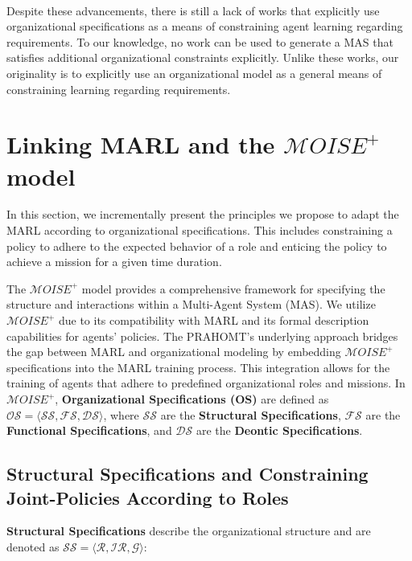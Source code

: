 \documentclass[sigconf,anonymous]{aamas}
\begin{document}
\

Despite these advancements, there is still a lack of works that explicitly use organizational specifications as a means of constraining agent learning regarding requirements. To our knowledge, no work can be used to generate a MAS that satisfies additional organizational constraints explicitly. Unlike these works, our originality is to explicitly use an organizational model as a general means of constraining learning regarding requirements.


\section{Linking MARL and the $\mathcal{M}OISE^+$ model}\label{sec:linking_marl_moise}
\label{sec:marl_moise_linking}

In this section, we incrementally present the principles we propose to adapt the MARL according to organizational specifications. This includes constraining a policy to adhere to the expected behavior of a role and enticing the policy to achieve a mission for a given time duration.


The $\mathcal{M}OISE^+$ model provides a comprehensive framework for specifying the structure and interactions within a Multi-Agent System (MAS). We utilize $\mathcal{M}OISE^+$ due to its compatibility with MARL and its formal description capabilities for agents' policies. The PRAHOMT's underlying approach bridges the gap between MARL and organizational modeling by embedding $\mathcal{M}OISE^+$ specifications into the MARL training process. This integration allows for the training of agents that adhere to predefined organizational roles and missions.
%
In $\mathcal{M}OISE^+$, \textbf{Organizational Specifications (OS)} are defined as $\mathcal{OS} = \langle \mathcal{SS}, \mathcal{FS}, \mathcal{DS} \rangle$, where $\mathcal{SS}$ are the \textbf{Structural Specifications}, $\mathcal{FS}$ are the \textbf{Functional Specifications}, and $\mathcal{DS}$ are the \textbf{Deontic Specifications}.

\subsection{Structural Specifications and Constraining Joint-Policies According to Roles}

\textbf{Structural Specifications} describe the organizational structure and are denoted as $\mathcal{SS} = \langle \mathcal{R}, \mathcal{IR}, \mathcal{G} \rangle$:
\end{document}

